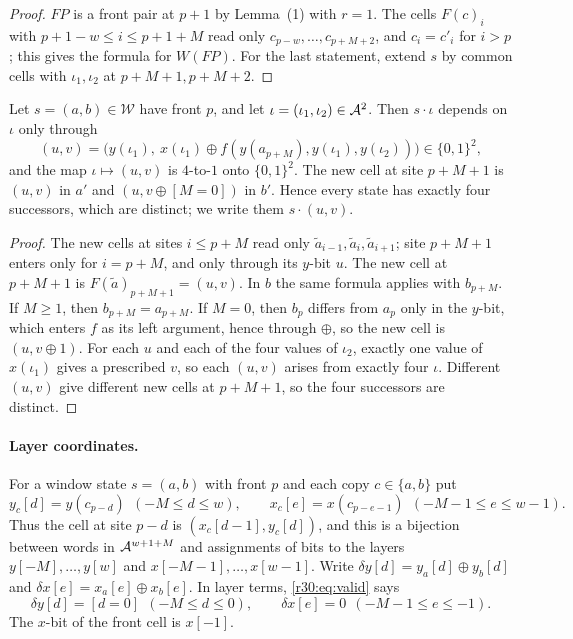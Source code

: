 \begin{proof}
$FP$ is a front pair at $p+1$ by Lemma~(1) with $r=1$. The cells $F(c)_i$ with $p+1-w\le i\le p+1+M$ read only $c_{p-w},\dots,c_{p+M+2}$, and $c_i=c'_i$ for $i>p$; this gives the formula for $W(FP)$. For the last statement, extend $s$ by common cells with $\iota_1,\iota_2$ at $p+M+1,p+M+2$.
\end{proof}

\begin{lemma}\label{r30:lem:inputs}
Let $s=(a,b)\in\mathcal{W}$ have front $p$, and let $\iota=(\iota_1,\iota_2)\in\mathcal{A}^2$. Then $s\cdot\iota$ depends on $\iota$ only through
\[
(u,v)=\bigl(y(\iota_1),\ x(\iota_1)\oplus f(y(a_{p+M}),y(\iota_1),y(\iota_2))\bigr)\in\{0,1\}^2,
\]
and the map $\iota\mapsto(u,v)$ is $4$-to-$1$ onto $\{0,1\}^2$. The new cell at site $p+M+1$ is $(u,v)$ in $a'$ and $(u,v\oplus[M=0])$ in $b'$. Hence every state has exactly four successors, which are distinct; we write them $s\cdot(u,v)$.
\end{lemma}

\begin{proof}
The new cells at sites $i\le p+M$ read only $\tilde a_{i-1},\tilde a_i,\tilde a_{i+1}$; site $p+M+1$ enters only for $i=p+M$, and only through its $y$-bit $u$. The new cell at $p+M+1$ is $F(\tilde a)_{p+M+1}=(u,v)$. In $b$ the same formula applies with $b_{p+M}$. If $M\ge1$, then $b_{p+M}=a_{p+M}$. If $M=0$, then $b_p$ differs from $a_p$ only in the $y$-bit, which enters $f$ as its left argument, hence through $\oplus$, so the new cell is $(u,v\oplus1)$. For each $u$ and each of the four values of $\iota_2$, exactly one value of $x(\iota_1)$ gives a prescribed $v$, so each $(u,v)$ arises from exactly four $\iota$. Different $(u,v)$ give different new cells at $p+M+1$, so the four successors are distinct.
\end{proof}

\paragraph{Layer coordinates.} For a window state $s=(a,b)$ with front $p$ and each copy $c\in\{a,b\}$ put
\begin{equation}\label{tc:eq:layers}
y_c[d]=y(c_{p-d})\ \ (-M\le d\le w),\qquad x_c[e]=x(c_{p-e-1})\ \ (-M-1\le e\le w-1).
\end{equation}
Thus the cell at site $p-d$ is $(x_c[d-1],y_c[d])$, and this is a bijection between words in $\mathcal{A}^{w+1+M}$ and assignments of bits to the layers $y[-M],\dots,y[w]$ and $x[-M-1],\dots,x[w-1]$. Write $\delta y[d]=y_a[d]\oplus y_b[d]$ and $\delta x[e]=x_a[e]\oplus x_b[e]$. In layer terms, \eqref{r30:eq:valid} says
\begin{equation}\label{r30:eq:validlayers}
\delta y[d]=[d=0]\ \ (-M\le d\le0),\qquad \delta x[e]=0\ \ (-M-1\le e\le-1).
\end{equation}
The $x$-bit of the front cell is $x[-1]$.

